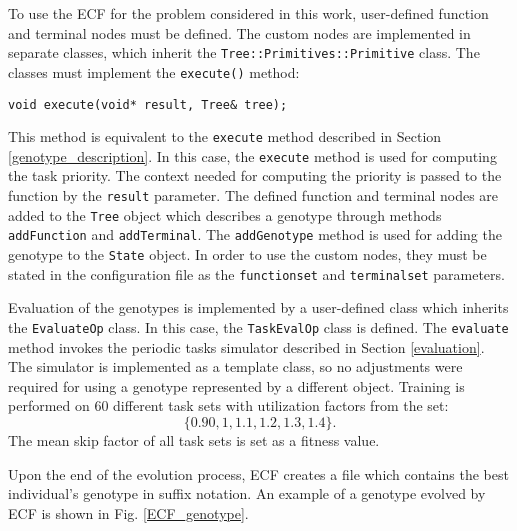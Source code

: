To use the ECF for the problem considered in this work, user-defined function and terminal nodes must be defined.
The custom nodes are implemented in separate classes, which inherit the \texttt{Tree::Primitives::Primitive} class.
The classes must implement the \texttt{execute()} method:
\begin{lstlisting}[frame=none, label={exec}, caption={A prototype of the \texttt{execute} method.}, captionpos=b]
    void execute(void* result, Tree& tree);
\end{lstlisting}
This method is equivalent to the \texttt{execute} method described in Section \ref{genotype_description}.
In this case, the \texttt{execute} method is used for computing the task priority.
The context needed for computing the priority is passed to the function by the \texttt{result} parameter.
The defined function and terminal nodes are added to the \texttt{Tree} object which describes a genotype through methods \texttt{addFunction} and \texttt{addTerminal}.
The \texttt{addGenotype} method is used for adding the genotype to the \texttt{State} object.
In order to use the custom nodes, they must be stated in the configuration file as the \texttt{functionset} and \texttt{terminalset} parameters.

Evaluation of the genotypes is implemented by a user-defined class which inherits the \texttt{EvaluateOp} class.
In this case, the \texttt{TaskEvalOp} class is defined.
The \texttt{evaluate} method invokes the periodic tasks simulator described in Section
\ref{evaluation}.
The simulator is implemented as a template class, so no adjustments were required for using a genotype represented by a different object.
Training is performed on 60 different task sets with utilization factors from the set:
\begin{equation*}
\{ 0.90, 1, 1.1, 1.2, 1.3, 1.4 \}.
\end{equation*}
The mean skip factor of all task sets is set as a fitness value.

Upon the end of the evolution process, ECF creates a file which contains the best individual's genotype in suffix notation.
An example of a genotype evolved by ECF is shown in Fig. \ref{ECF_genotype}.

